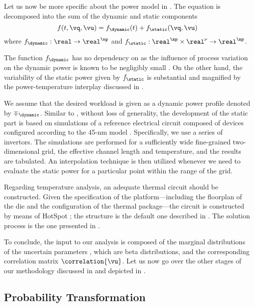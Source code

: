 Let us now be more specific about the power model in .
The equation is decomposed into the sum of the dynamic and static components
\[
  f(t, \vq, \vu) = f_\dynamic(t) + f_\static(\vq, \vu)
\]
where $f_\dynamic: \real \to \real^\np$ and $f_\static: \real^\np \times
\real^\nu \to \real^\np$.

\begin{remark}
The function $f_\dynamic$ has no dependency on \vu as the influence of process
variation on the dynamic power is known to be negligibly small
\cite{srivastava2010}. On the other hand, the variability of the static power
given by $f_\static$ is substantial and magnified by the power-temperature
interplay discussed in .
\end{remark}

We assume that the desired workload is given as a dynamic power profile denoted
by $\mp_\dynamic$. Similar to , without loss of
generality, the development of the static part is based on 
simulations of a reference electrical circuit composed of  devices
\cite{bsim} configured according to the 45-nm  model \cite{ptm}.
Specifically, we use a series of  invertors. The simulations are
performed for a sufficiently wide fine-grained two-dimensional grid, the
effective channel length and temperature, and the results are tabulated. An
interpolation technique is then utilized whenever we need to evaluate the static
power for a particular point within the range of the grid.

Regarding temperature analysis, an adequate thermal  circuit should be
constructed. Given the specification of the platform---including the floorplan
of the die and the configuration of the thermal package---the circuit is
constructed by means of HotSpot \cite{skadron2003}; the structure is the default
one described in . The solution process is the one
presented in .

To conclude, the input to our analysis is composed of the marginal distributions
of the uncertain parameters \vu, which are beta distributions, and the
corresponding correlation matrix $\correlation{\vu}$. Let us now go over the
other stages of our methodology discussed in 
and depicted in .

\subsection{Probability Transformation}

